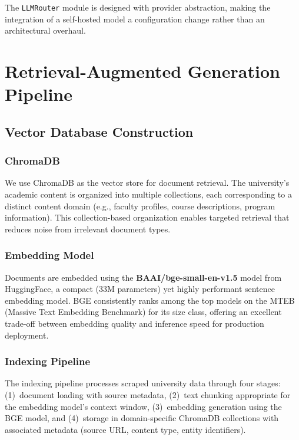 \documentclass[conference,compsoc]{IEEEtran}
\begin{document}
The \texttt{LLMRouter} module is designed with provider abstraction, making the integration of a self-hosted model a configuration change rather than an architectural overhaul.

\section{Retrieval-Augmented Generation Pipeline}
\label{sec:rag}

\subsection{Vector Database Construction}

\subsubsection{ChromaDB}

We use ChromaDB as the vector store for document retrieval. The university's academic content is organized into multiple collections, each corresponding to a distinct content domain (e.g., faculty profiles, course descriptions, program information). This collection-based organization enables targeted retrieval that reduces noise from irrelevant document types.

\subsubsection{Embedding Model}

Documents are embedded using the \textbf{BAAI/bge-small-en-v1.5} model from HuggingFace, a compact (33M parameters) yet highly performant sentence embedding model. BGE consistently ranks among the top models on the MTEB (Massive Text Embedding Benchmark) for its size class, offering an excellent trade-off between embedding quality and inference speed for production deployment.

\subsubsection{Indexing Pipeline}

The indexing pipeline processes scraped university data through four stages: (1)~document loading with source metadata, (2)~text chunking appropriate for the embedding model's context window, (3)~embedding generation using the BGE model, and (4)~storage in domain-specific ChromaDB collections with associated metadata (source URL, content type, entity identifiers).
\end{document}
